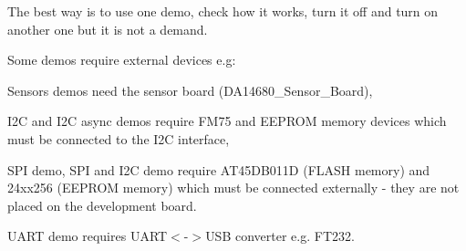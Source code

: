 The best way is to use one demo, check how it works, turn it off and turn on another one but it is not a demand.

Some demos require external devices e.\+g\+:


\begin{DoxyItemize}
\item Sensors\textquotesingle{} demos need the sensor board (D\+A14680\+\_\+\+Sensor\+\_\+\+Board),
\item I2\+C and I2\+C async demos require F\+M75 and E\+E\+P\+R\+O\+M memory devices which must be connected to the I2\+C interface,
\item S\+P\+I demo, S\+P\+I and I2\+C demo require A\+T45\+D\+B011\+D (F\+L\+A\+S\+H memory) and 24xx256 (E\+E\+P\+R\+O\+M memory) which must be connected externally -\/ they are not placed on the development board.
\item U\+A\+R\+T demo requires U\+A\+R\+T$<$-\/$>$U\+S\+B converter e.\+g. F\+T232. 
\end{DoxyItemize}